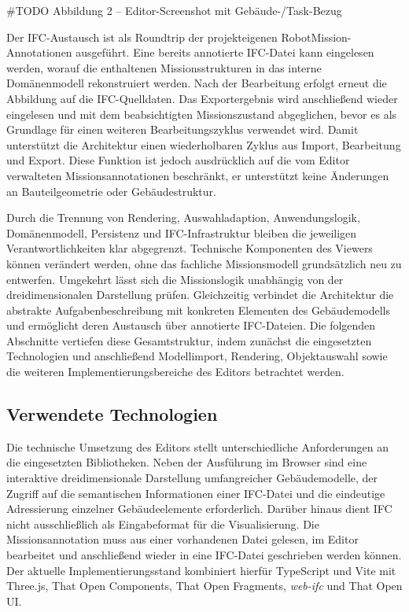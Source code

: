 \#TODO Abbildung 2 – Editor-Screenshot mit Gebäude-/Task-Bezug

Der IFC-Austausch ist als Roundtrip der projekteigenen RobotMission-Annotationen ausgeführt. Eine
bereits annotierte IFC-Datei kann eingelesen werden, worauf die enthaltenen Missionsstrukturen in
das interne Domänenmodell rekonstruiert werden. Nach der Bearbeitung erfolgt erneut die Abbildung
auf die IFC-Quelldaten. Das Exportergebnis wird anschließend wieder eingelesen und mit dem
beabsichtigten Missionszustand abgeglichen, bevor es als Grundlage für einen weiteren
Bearbeitungszyklus verwendet wird. Damit unterstützt die Architektur einen wiederholbaren Zyklus aus
Import, Bearbeitung und Export. Diese Funktion ist jedoch ausdrücklich auf die vom Editor
verwalteten Missionsannotationen beschränkt, er unterstützt keine Änderungen an Bauteilgeometrie oder 
Gebäudestruktur.

Durch die Trennung von Rendering, Auswahladaption, Anwendungslogik, Domänenmodell, Persistenz und
IFC-Infrastruktur bleiben die jeweiligen Verantwortlichkeiten klar abgegrenzt. Technische
Komponenten des Viewers können verändert werden, ohne das fachliche Missionsmodell grundsätzlich neu
zu entwerfen. Umgekehrt lässt sich die Missionslogik unabhängig von der dreidimensionalen
Darstellung prüfen. Gleichzeitig verbindet die Architektur die abstrakte Aufgabenbeschreibung mit
konkreten Elementen des Gebäudemodells und ermöglicht deren Austausch über annotierte IFC-Dateien.
Die folgenden Abschnitte vertiefen diese Gesamtstruktur, indem zunächst die eingesetzten
Technologien und anschließend Modellimport, Rendering, Objektauswahl sowie die weiteren
Implementierungsbereiche des Editors betrachtet werden.

\subsection{Verwendete Technologien}\label{sec:Technologien}
Die technische Umsetzung des Editors stellt unterschiedliche Anforderungen an die eingesetzten
Bibliotheken. Neben der Ausführung im Browser sind eine interaktive dreidimensionale Darstellung
umfangreicher Gebäudemodelle, der Zugriff auf die semantischen Informationen einer IFC-Datei und die
eindeutige Adressierung einzelner Gebäudeelemente erforderlich. Darüber hinaus dient IFC nicht
ausschließlich als Eingabeformat für die Visualisierung. Die Missionsannotation muss aus einer
vorhandenen Datei gelesen, im Editor bearbeitet und anschließend wieder in eine IFC-Datei
geschrieben werden können. Der aktuelle Implementierungsstand kombiniert hierfür TypeScript und Vite
mit Three.js, That Open Components, That Open Fragments, \textit{web-ifc} und That Open UI.

